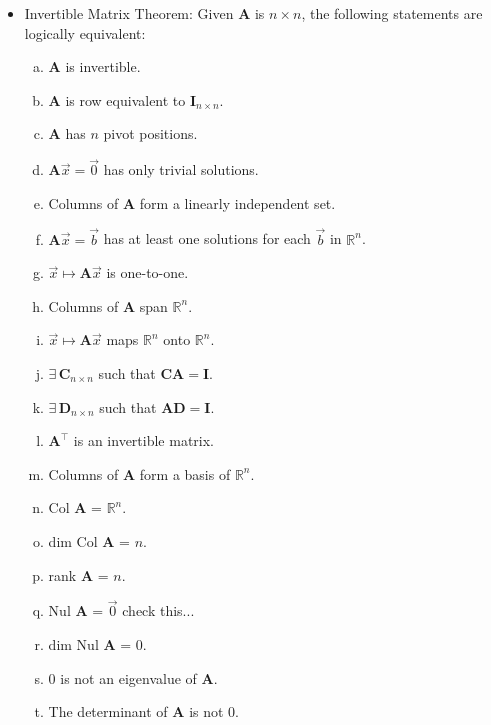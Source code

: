 \documentclass[11pt]{article}
\newcommand{\Thm}{\fbox{Thm}}
\newcommand{\R}{\mathbb{R}}
\newcommand{\A}{\mathbf{A}}
\newcommand{\I}{\mathbf{I}}
\begin{document}
\begin{itemize}
\item[\Thm] Invertible Matrix Theorem: Given $\A$ is $n \times n$, the following statements are logically equivalent:
\begin{enumerate} [a)]
  \item $\A$ is invertible.
  \item $\A$ is row equivalent to $\I_{n \times n}$.
  \item $\A$ has $n$ pivot positions.
  \item $\A \vec{x} = \vec{0}$ has only trivial solutions.
  \item Columns of $\A$ form a linearly independent set.
  \item $\A \vec{x} = \vec{b}$ has at least one solutions for each $\vec{b}$ in $\R^n$.
  \item $\vec{x} \mapsto \A \vec{x}$ is one-to-one.
  \item Columns of $\A$ span $\R^n$.
  \item $\vec{x} \mapsto \A \vec{x}$ maps $\R^n$ onto $\R^n$.
  \item $\exists \, \mathbf{C}_{n \times n}$ such that $\mathbf{C} \A = \I$.
  \item $\exists \, \mathbf{D}_{n \times n}$ such that $\A \mathbf{D} = \I$.
  \item $\A^\intercal$ is an invertible matrix.
  \item Columns of $\A$ form a basis of $\R^n$.
  \item Col $\A$ = $\R^n$.
  \item dim Col $\A$ = $n$.
  \item rank $\A$ = $n$.
  \item Nul $\A$ = ${\vec{0}}$ check this...
  \item dim Nul $\A$ = 0.
  \item 0 is not an eigenvalue of $\A$.
  \item The determinant of $\A$ is not 0.
\end{enumerate}
\end{itemize}
\end{document}
